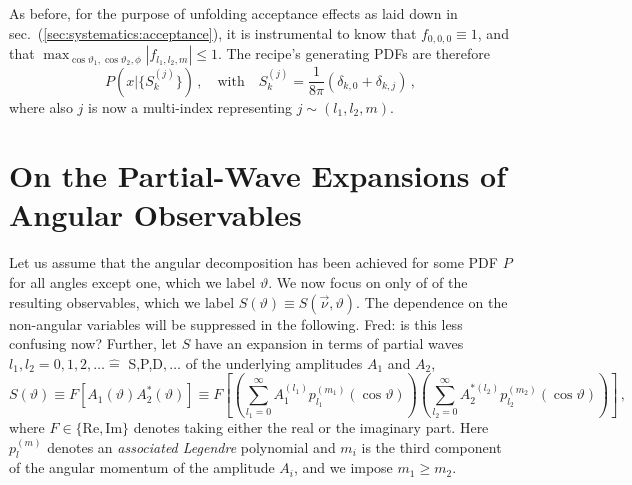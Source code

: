 \documentclass[aps,prd,reprint,nofootinbib,preprintnumbers]{revtex4}
\newcommand{\refsec}[1]{sec.~(\ref{sec:#1})}
\renewcommand{\theta}{\vartheta}
\newcommand{\danny}[1]{{\color{purple}#1}}
\begin{document}
As before, for the purpose of unfolding acceptance effects as laid down in \refsec{systematics:acceptance}, it is instrumental
to know that $f_{0,0,0} \equiv 1$, and that $\max_{\cos\theta_1,\cos\theta_2,\phi} |f_{l_1, l_2, m}| \leq 1$.
The recipe's generating PDFs are therefore
\begin{equation}
    P(x|\lbrace S_k^{(j)}\rbrace)\,,\quad\text{with}\quad S_k^{(j)} = \frac{1}{8\pi}\left(\delta_{k,0} + \delta_{k,j}\right)\,,
\end{equation}
where also $j$ is now a multi-index representing $j \sim (l_1, l_2, m)$.


\section{On the Partial-Wave Expansions of Angular Observables}
\label{app:partial-waves}

Let us assume that the angular decomposition has been achieved for some
PDF $P$ for all angles except one, which we label $\theta$. We now focus on only of of the resulting
observables, which we label $S(\theta) \equiv S(\vec{\nu},\theta)$. The dependence on the non-angular
variables will be suppressed in the following. \danny{Fred: is this less confusing now?}
Further, let $S$ have an expansion in terms of partial waves
$l_1, l_2 = 0,1,2,\dots \hat{=}$ S,P,D$,\dots$ of the underlying amplitudes $A_1$ and $A_2$,
\begin{equation}
    \label{eq:def-partial-wave-observable}
    S(\theta) \equiv F\left[A_1(\theta) A_2^*(\theta)\right] \equiv F\left[\left(\sum_{l_1=0}^\infty A_1^{(l_1)} p_{l_1}^{(m_1)}(\cos\theta)\right) \left(\sum_{l_2=0}^\infty A_2^{*(l_2)} p_{l_2}^{(m_2)}(\cos\theta)\right)\right]\,,
\end{equation}
where $F \in \{\text{Re},\text{Im}\}$ denotes taking either the real
or the imaginary part. Here $p_{l}^{(m)}$ denotes an \emph{associated Legendre} polynomial and $m_i$ is the third component of the angular momentum of the amplitude $A_i$, and we impose $m_1 \geq m_2$.\\
\end{document}
